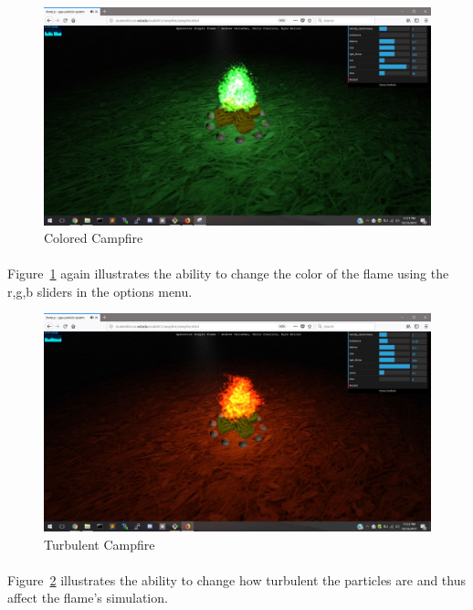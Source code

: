 \documentclass[letterpaper]{article}
\begin{document}
\begin{figure}[H]
\centering
\includegraphics[scale=.35]{result5.JPG}
\caption{Colored Campfire}
\label{fig:result5}
\end{figure}
\paragraph{}
Figure~\ref{fig:result5} again illustrates the ability to change the color of the flame using the r,g,b sliders in the options menu.

\begin{figure}[H]
\centering
\includegraphics[scale=.35]{result6.JPG}
\caption{Turbulent Campfire}
\label{fig:result6}
\end{figure}
\paragraph{}
Figure~\ref{fig:result6} illustrates the ability to change how turbulent the particles are and thus affect the flame's simulation.
\end{document}
